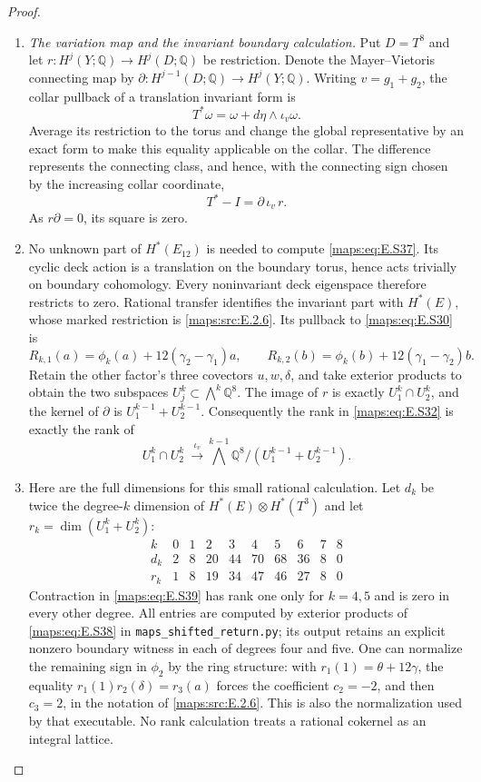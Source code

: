 \begin{proof}
\begin{enumerate}[label=\arabic*.,leftmargin=*]
\item \emph{The variation map and the invariant boundary calculation.}
Put $D=T^8$ and let $r:H^j(Y;\mathbb Q)\to H^j(D;\mathbb Q)$
be restriction. Denote the Mayer--Vietoris connecting map
by $\partial:H^{j-1}(D;\mathbb Q)\to H^j(Y;\mathbb Q)$.
Writing $v=g_1+g_2$, the collar pullback of a translation
invariant form is
\[
       T^*\omega=\omega+d\eta\wedge\iota_v\omega.
\]
Average its restriction to the torus and change the global
representative by an exact form to make this equality
applicable on the collar. The difference represents the
connecting class, and hence, with the connecting sign
chosen by the increasing collar coordinate,
\[
                          T^*-I=\partial\,\iota_v\,r.
 \tag{E.S37}\label{maps:eq:E.S37}
\]
As $r\partial=0$, its square is zero.

\item No unknown part of $H^*(E_{12})$ is needed to compute
\eqref{maps:eq:E.S37}. Its cyclic deck action is a translation on the
boundary torus, hence acts trivially on boundary cohomology.
Every noninvariant deck eigenspace therefore restricts to
zero. Rational transfer identifies the invariant part
with $H^*(E)$, whose marked restriction is \ref{maps:src:E.2.6}. Its
pullback to \eqref{maps:eq:E.S30} is
\[
 R_{k,1}(a)=\phi_k(a)+12(\gamma_2-\gamma_1)a,
 \qquad
 R_{k,2}(b)=\phi_k(b)+12(\gamma_1-\gamma_2)b.
 \tag{E.S38}\label{maps:eq:E.S38}
\]
Retain the other factor's three covectors $u,w,\delta$,
and take exterior products to obtain the two subspaces
$U_j^k\subset\bigwedge^k\mathbb Q^8$.
The image of $r$ is exactly $U_1^k\cap U_2^k$, and the
kernel of $\partial$ is $U_1^{k-1}+U_2^{k-1}$.
Consequently the rank in \eqref{maps:eq:E.S32} is exactly the rank of
\[
 U_1^k\cap U_2^k\ \stackrel{\iota_v}{\longrightarrow}
 \bigwedge^{k-1}\mathbb Q^8/(U_1^{k-1}+U_2^{k-1}).
 \tag{E.S39}\label{maps:eq:E.S39}
\]

\item Here are the full dimensions for this small rational
calculation. Let $d_k$ be twice the degree-$k$ dimension
of $H^*(E)\otimes H^*(T^3)$ and let
$r_k=\dim(U_1^k+U_2^k)$:
\[
 \begin{array}{c|rrrrrrrrr}
 k&0&1&2&3&4&5&6&7&8\\ \hline
 d_k&2&8&20&44&70&68&36&8&0\\
 r_k&1&8&19&34&47&46&27&8&0
 \end{array}
 \tag{E.S40}\label{maps:eq:E.S40}
\]
Contraction in \eqref{maps:eq:E.S39} has rank one only for
$k=4,5$ and is zero in every other degree. All entries
are computed by exterior products of \eqref{maps:eq:E.S38} in
\texttt{maps\_shifted\_return.py}; its output retains an
explicit nonzero boundary witness in each of degrees
four and five. One can normalize the remaining sign in
$\phi_2$ by the ring structure: with
$r_1(1)=\theta+12\gamma$, the equality
$r_1(1)r_2(\delta)=r_3(a)$ forces the coefficient
$c_2=-2$, and then $c_3=2$, in the notation of \ref{maps:src:E.2.6}.
This is also the normalization used by that executable.
No rank calculation treats a rational cokernel as an
integral lattice.


\end{enumerate}
\end{proof}
